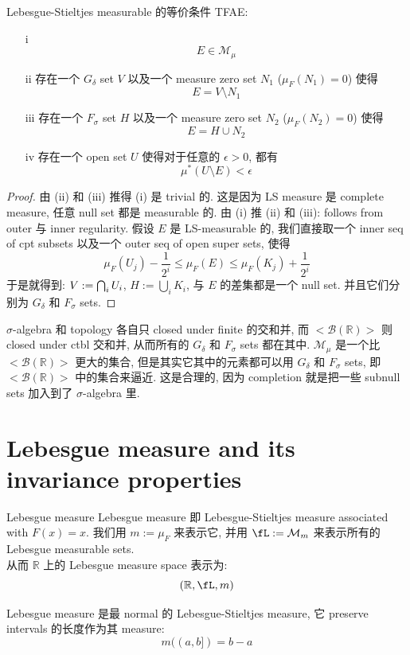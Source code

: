 \documentclass[lang=cn,11pt]{elegantbook}
\begin{document}
\begin{theorem}{Lebesgue-Stieltjes measurable 的等价条件}
\label{Lebesgue-Stieltjes measurable 的等价条件}
TFAE:
\begin{enumerate}
    \item[i] $$E \in \mathcal{M}_\mu$$
    \item[ii] 存在一个 $G_\delta$ set $V$ 以及一个 measure zero set $N_1$ ($\mu_F(N_1) = 0$) 使得   $$E = V \setminus N_1$$
    \item[iii] 存在一个 $F_\sigma$ set $H$ 以及一个 measure zero set $N_2$ ($\mu_F(N_2) = 0$) 使得 $$E = H \cup N_2$$
    \item[iv] 存在一个 open set $U$ 使得对于任意的 $\epsilon > 0$, 都有 $$\mu^*(U \setminus E) < \epsilon $$
\end{enumerate}
\end{theorem}

\begin{proof}
由 (ii) 和 (iii) 推得 (i) 是 trivial 的. 这是因为 LS measure 是 complete measure, 任意 null set 都是 measurable 的.
由 (i) 推 (ii) 和 (iii): follows from outer 与 inner regularity. 假设 $E$ 是 LS-measurable 的, 我们直接取一个 inner seq of cpt subsets 以及一个 outer seq of open super sets, 使得
\begin{equation}
    \mu_F(U_j) -  \frac{1}{2^i} \leq \mu_F(E) \leq \mu_F(K_j ) + \frac{1}{2^i}
\end{equation}
于是就得到: $V := \bigcap_i U_i$, $H := \bigcup_i K_i$, 与 $E$ 的差集都是一个 null set. 并且它们分别为 $G_\delta$ 和 $F_\sigma$ sets.
\end{proof}
\begin{remark}
    $\sigma$-algebra 和 topology 各自只 closed under finite 的交和并, 而 $<\mathcal{B}(\mathbb{R})>$ 则 closed under ctbl 交和并, 从而所有的  $G_\delta$ 和 $F_\sigma$ sets 都在其中. $\mathcal{M}_\mu$ 是一个比 $<\mathcal{B}(\mathbb{R})>$ 更大的集合, 但是其实它其中的元素都可以用 $G_\delta$ 和 $F_\sigma$ sets, 即 $<\mathcal{B}(\mathbb{R})>$ 中的集合来逼近. 这是合理的, 因为 completion 就是把一些 subnull sets 加入到了 $\sigma$-algebra 里.
\end{remark}





\section{Lebesgue measure and its invariance properties}
\begin{definition}{Lebesgue measure}
Lebesgue measure 即 Lebesgue-Stieltjes measure associated with $F(x) = x$.
我们用 $m:=\mu_F$ 来表示它, 并用 $\fL := \mathcal{M}_m$ 来表示所有的 Lebesgue measurable sets.\\
从而 $\mathbb{R}$ 上的 Lebesgue measure space 表示为:
$$
(\mathbb{R}, \fL, m)
$$
\end{definition}
\begin{remark}
    Lebesgue measure 是最 normal 的 Lebesgue-Stieltjes measure, 它 preserve intervals 的长度作为其 measure: 
    $$
    m((a,b]) = b -a
    $$
\end{remark}
\end{document}
